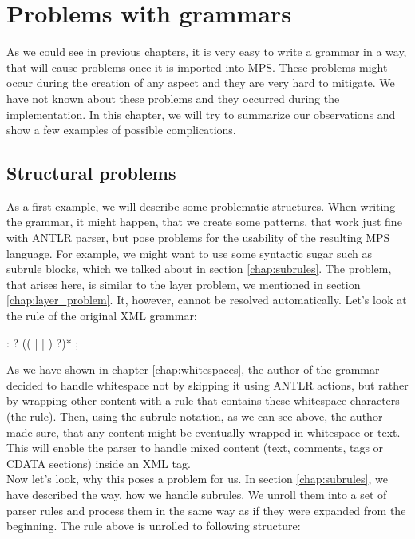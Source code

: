 \chapter{Problems with grammars}
\label{chap:problems_with_grammars}

As we could see in previous chapters, it is very easy to write a grammar in a way, that will cause problems once it is imported into MPS.
These problems might occur during the creation of any aspect and they are very hard to mitigate.
We have not known about these problems and they occurred during the implementation.
In this chapter, we will try to summarize our observations and show a few examples of possible complications.
\\

\section{Structural problems}

As a first example, we will describe some problematic structures.
When writing the grammar, it might happen, that we create some patterns, that work just fine with ANTLR parser, but pose problems for the usability of the resulting MPS language.
For example, we might want to use some syntactic sugar such as subrule blocks, which we talked about in section \ref{chap:subrules}.
The problem, that arises here, is similar to the layer problem, we mentioned in section \ref{chap:layer_problem}.
It, however, cannot be resolved automatically.
Let's look at the  rule of the original XML grammar:

\begin{antlr}
	 :   ? (( |  | ) ?)* ;
\end{antlr}

As we have shown in chapter \ref{chap:whitespaces}, the author of the grammar decided to handle whitespace not by skipping it using ANTLR actions, but rather by wrapping other content with a rule that contains these whitespace characters (the  rule).
Then, using the subrule notation, as we can see above, the author made sure, that any content might be eventually wrapped in whitespace or text.
This will enable the parser to handle mixed content (text, comments, tags or CDATA sections) inside an XML tag.
\\

Now let's look, why this poses a problem for us.
In section \ref{chap:subrules}, we have described the way, how we handle subrules.
We unroll them into a set of parser rules and process them in the same way as if they were expanded from the beginning.
The rule above is unrolled to following structure:


